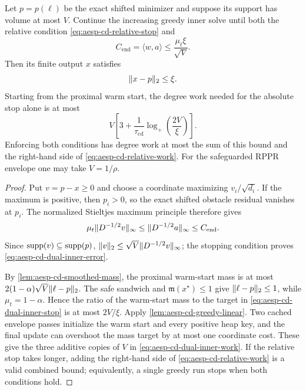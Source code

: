 \begin{corollary}
\label{cor:aesp-cd-dual-inner-stop}
Let $p=p(\ell)$ be the exact shifted minimizer and suppose its support has
volume at most $V$.  Continue the increasing greedy inner solve until both
the relative condition \cref{eq:aesp-cd-relative-stop} and
\begin{equation}
 C_{\mathrm{end}}=\langle w,a\rangle
 \leq\frac{\mu_t\xi}{\sqrt V}.
 \label{eq:aesp-cd-dual-inner-stop}
\end{equation}
Then its finite output $x$ satisfies
\begin{equation}
 \lVert x-p\rVert_2\leq\xi.
 \label{eq:aesp-cd-dual-inner-error}
\end{equation}
Starting from the proximal warm start, the degree work needed for the
absolute stop alone is at most
\begin{equation}
 V\left[3+\frac1{\tau_{\mathrm{cd}}}
       \log_+\left(\frac{2V}{\xi}\right)\right].
 \label{eq:aesp-cd-dual-inner-work}
\end{equation}
Enforcing both conditions has degree work at most the sum of this bound and
the right-hand side of \cref{eq:aesp-cd-relative-work}.  For the safeguarded
RPPR envelope one may take $V=1/\rho$.
\end{corollary}

\begin{proof}
Put $v=p-x\geq0$ and choose a coordinate maximizing
$v_i/\sqrt{d_i}$.  If the maximum is positive, then $p_i>0$, so the exact
shifted obstacle residual vanishes at $p_i$.  The normalized Stieltjes
maximum principle therefore gives
\begin{equation*}
 \mu_t\lVert D^{-1/2}v\rVert_\infty
 \leq\lVert D^{-1/2}a\rVert_\infty
 \leq C_{\mathrm{end}}.
\end{equation*}
Since $\operatorname{supp}(v)\subseteq\operatorname{supp}(p)$,
$\lVert v\rVert_2\leq\sqrt V\lVert D^{-1/2}v\rVert_\infty$; the stopping condition proves
\cref{eq:aesp-cd-dual-inner-error}.

By \cref{lem:aesp-cd-smoothed-mass}, the proximal warm-start mass is at most
$2(1-\alpha)\sqrt V\lVert\ell-p\rVert_2$.  The safe sandwich and
$\mathfrak m(x^\star)\leq1$ give
$\lVert\ell-p\rVert_2\leq1$, while $\mu_t=1-\alpha$.  Hence the ratio of the
warm-start mass to the target in
\cref{eq:aesp-cd-dual-inner-stop} is at most $2V/\xi$.
Apply \cref{lem:aesp-cd-greedy-linear}.  Two cached envelope passes initialize
the warm start and every positive heap key, and the final update can overshoot
the mass target by at most one coordinate cost.  These give the three
additive copies of $V$ in \cref{eq:aesp-cd-dual-inner-work}.  If the relative
stop takes longer, adding the right-hand side of
\cref{eq:aesp-cd-relative-work} is a valid combined bound; equivalently, a
single greedy run stops when both conditions hold.
\end{proof}
